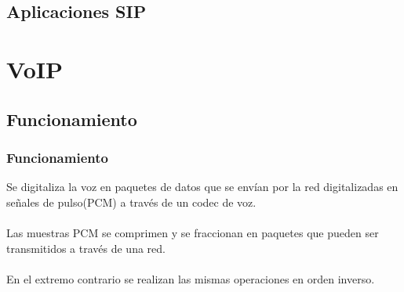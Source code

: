 \documentclass{beamer}
\begin{document}
	\subsection{Aplicaciones SIP}

\section{VoIP}

	\subsection{Funcionamiento}
	\begin{frame}
	\frametitle{Funcionamiento}
		Se digitaliza la voz en paquetes de datos que se envían por la red digitalizadas en señales de pulso(PCM) a través de un codec de voz.\\~\\
		Las muestras PCM se comprimen y se fraccionan en paquetes que pueden ser transmitidos a través de una red.\\~\\
		En el extremo contrario se realizan las mismas operaciones en orden inverso.
	\end{frame}
	
\end{document}
